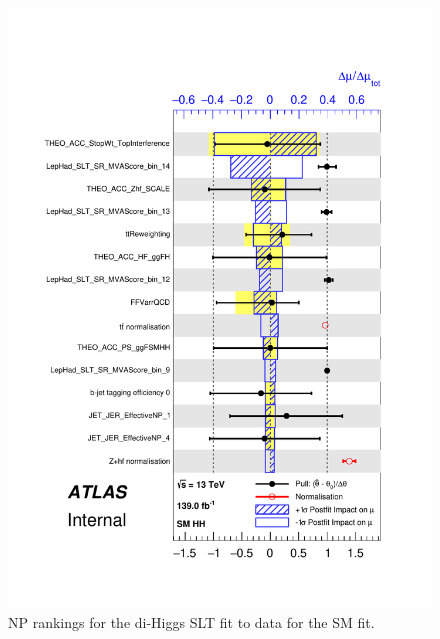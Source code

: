   \begin{figure}
   \centering
   \includegraphics[width=.8\textwidth]{figures/results/HH/LepHad/pulls_SigXsecOverSM_125_SLT.pdf}
   \caption{NP rankings for the di-Higgs \lephad SLT fit to data for the SM fit.}
   \label{fig:LepHadPostfitNPRankingsSMSLT}
   \end{figure}
   
